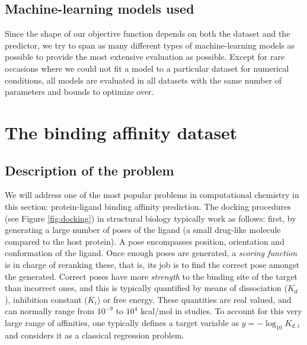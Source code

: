 \documentclass[10pt,a4paper,twoside]{book}
\begin{document}
\subsection{Machine-learning models used}

Since the shape of our objective function depends on both the dataset and the predictor, we try to span as many different types of machine-learning models as possible to provide the most extensive evaluation as possible. Except for rare occasions where we could not fit a model to a particular dataset for numerical conditions, all models are evaluated in all datasets with the same number of parameters and bounds to optimize over.

\section{The binding affinity dataset}

\subsection{Description of the problem}

We will address one of the most popular problems in computational chemistry in this section: protein-ligand binding affinity prediction. The docking procedures (see Figure \ref{fig:docking}) in structural biology typically work as follows: first, by generating a large number of poses of the ligand (a small drug-like molecule compared to the host protein). A pose encompasses position, orientation and conformation of the ligand. Once enough poses are generated, a \textit{scoring function} is in charge of reranking these, that is, its job is to find the correct pose amongst the generated. Correct poses have more \textit{strength} to the binding site of the target than incorrect ones, and this is typically quantified by means of dissociation ($K_d$), inhibition constant ($K_i$) or free energy. These quantities are real valued, and can normally range from $10^{-9}$ to $10^4$ kcal/mol in studies. To account for this very large range of affinities, one typically defines a target variable as $y=-\log_{10}K_{d,i}$ and considers it as a classical regression problem.\\
\end{document}
